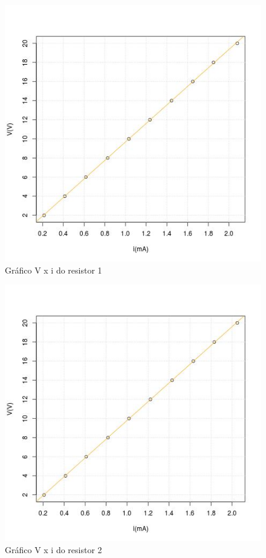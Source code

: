 \documentclass[11pt,a4paper]{article}
\begin{document}
      \begin{figure}[htb!]
        \centering
        \captionsetup{justification=centering}  
        \includegraphics[scale=0.55]{Vi1}
        \caption{Gráfico V x i do resistor 1}
        \label{fig:i1}
      \end{figure}
      
      \begin{figure}[htb!]
        \centering
        \captionsetup{justification=centering}  
        \includegraphics[scale=0.55]{Vi2}
        \caption{Gráfico V x i do resistor 2}
        \label{fig:i2}
      \end{figure}
      
\end{document}
